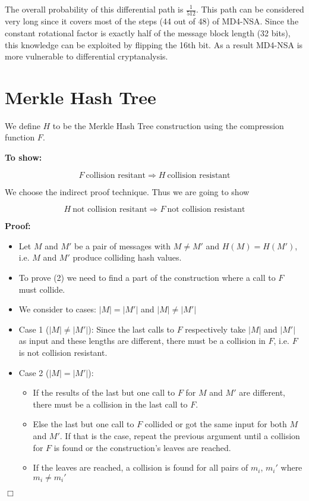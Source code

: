 The overall probability of this differential path is $\frac{1}{512}$. This path can be considered very long since it covers most of the steps (44 out of 48) of MD4-NSA. Since the constant rotational factor is exactly half of the message block length (32 bits), this knowledge can be exploited by flipping the 16th bit. As a result MD4-NSA is more vulnerable to differential cryptanalysis.

\section{Merkle Hash Tree}
We define $H$ to be the Merkle Hash Tree construction using the compression function $F$.

\textbf{To show:}

\begin{equation}
F\ \text{collision resitant} \Rightarrow H\ \text{collision resistant}
\end{equation}

We choose the indirect proof technique. Thus we are going to show

\begin{equation}
H\ \text{not collision resitant} \Rightarrow F\ \text{not collision resistant}
\end{equation}

\newpage

\textbf{Proof:}

\begin{itemize}
\item Let $M$ and $M'$ be a pair of messages with $M \neq M'$ and $H(M) = H(M')$, i.e. $M$ and $M'$ produce colliding hash values.
\item To prove (2) we need to find a part of the construction where a call to $F$ must collide.
\item We consider to cases: $|M| = |M'|$ and $|M| \neq |M'|$
\item Case 1 ($|M| \neq |M'|$): Since the last calls to $F$ respectively take $|M|$ and $|M'|$ as input and these lengths are different, there must be a collision in $F$, i.e. $F$ is not collision resistant.
\item Case 2 ($|M| = |M'|$):

\begin{itemize}
\item If the results of the last but one call to $F$ for $M$ and $M'$ are different, there must be a collision in the last call to $F$.
\item Else the last but one call to $F$ collided or got the same input for both $M$ and $M'$. If that is the case, repeat the previous argument until a collision for $F$ is found or the construction's leaves are reached.
\item If the leaves are reached, a collision is found for all pairs of $m_i$, $m_i'$ where $m_i \neq m_i'$
\end{itemize}

\end{itemize}
\hfill$\Box$


